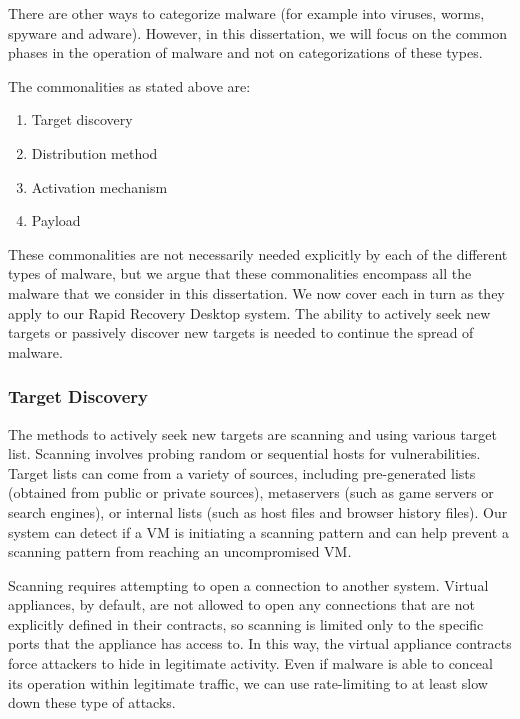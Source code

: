 There are other ways to categorize malware (for example into viruses, worms, spyware and adware). However, in this dissertation, we will focus on the common phases in the operation of malware and not on categorizations of these types.

The commonalities as stated above are:

\begin{enumerate}
\item{Target discovery}
\item{Distribution method}
\item{Activation mechanism}
\item{Payload}
\end{enumerate}

These commonalities are not necessarily needed explicitly by each of the different types of malware, but we argue that these commonalities encompass all the malware that we consider in this dissertation. We now cover each in turn as they apply to our Rapid Recovery Desktop system. The ability to actively seek new targets or passively discover new targets is needed to continue the spread of malware.

\subsubsection{Target Discovery}
The methods to actively seek new targets are scanning and using various target list. Scanning involves probing random or sequential hosts for vulnerabilities. Target lists can come from a variety of sources, including pre-generated lists (obtained from public or private sources), metaservers (such as game servers or search engines), or internal lists (such as host files and browser history files). Our system can detect if a VM is initiating a scanning pattern and can help prevent a scanning pattern from reaching an uncompromised VM.

Scanning requires attempting to open a connection to another system. Virtual appliances, by default, are not allowed to open any connections that are not explicitly defined in their contracts, so scanning is limited only to the specific ports that the appliance has access to. In this way, the virtual appliance contracts force attackers to hide in legitimate activity. Even if malware is able to conceal its operation within legitimate traffic, we can use rate-limiting to at least slow down these type of attacks.

